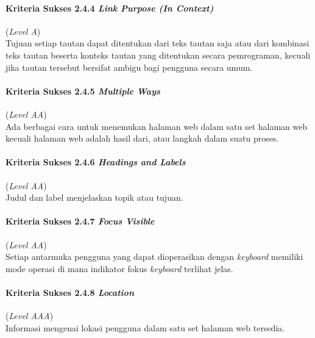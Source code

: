\paragraph{Kriteria Sukses 2.4.4 \textit{Link Purpose (In Context)}}
\label{subsec:kriteria_2.4.4}
(\textit{Level A}) \\

Tujuan setiap tautan dapat ditentukan dari teks tautan saja atau dari kombinasi teks tautan beserta konteks tautan yang ditentukan secara pemrograman, kecuali jika tautan tersebut bersifat ambigu bagi pengguna secara umum.

\paragraph{Kriteria Sukses 2.4.5 \textit{Multiple Ways}}
\label{subsec:kriteria_2.4.5}
(\textit{Level AA}) \\

Ada berbagai cara untuk menemukan halaman web dalam satu set halaman web kecuali halaman web adalah hasil dari, atau langkah dalam suatu proses.

\paragraph{Kriteria Sukses 2.4.6 \textit{Headings and Labels}}
\label{subsec:kriteria_2.4.6}
(\textit{Level AA}) \\

Judul dan label menjelaskan topik atau tujuan.

\paragraph{Kriteria Sukses 2.4.7 \textit{Focus Visible}}
\label{subsec:kriteria_2.4.7}
(\textit{Level AA}) \\

Setiap antarmuka pengguna yang dapat dioperasikan dengan \textit{keyboard} memiliki mode operasi di mana indikator fokus \textit{keyboard} terlihat jelas.

\paragraph{Kriteria Sukses 2.4.8 \textit{Location}}
\label{subsec:kriteria_2.4.8}
(\textit{Level AAA}) \\

Informasi mengenai lokasi pengguna dalam satu set halaman web tersedia.

